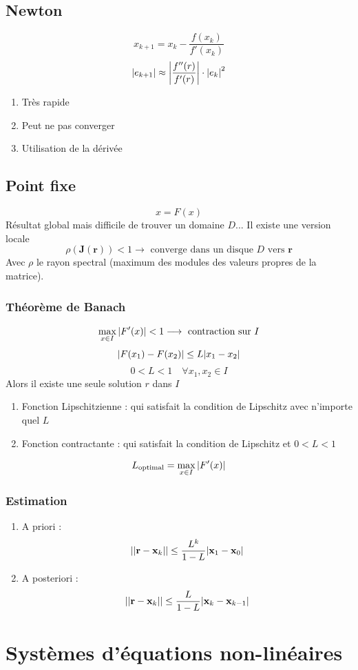 \documentclass[resume]{subfiles}
\begin{document}
\subsection{Newton}
$$\boxed{x_{k+1}=x_{k}-\frac{f(x_{k})}{f'(x_{k})}}$$
$$\abs{e_{k+1}}\approx \abs{\frac{f''(r)}{f'(r)}}\cdot \abs{e_k}^2$$
\begin{enumerate}
\item Très rapide
\item Peut ne pas converger
\item Utilisation de la dérivée
\end{enumerate}
\subsection{Point fixe}
$$\boxed{x=F(x)}$$
Résultat global mais difficile de trouver un domaine $D$... Il existe une version locale
$$\rho(\mathbf{J}(\mathbf{r}))<1\longrightarrow\text{ converge dans un disque } D\text{ vers }\mathbf{r}$$
Avec $\rho$ le rayon spectral (maximum des modules des valeurs propres de la matrice).
\subsubsection{Théorème de Banach}
$$\max_{x\in I}\abs{F'(x)}<1\longrightarrow\text{ contraction sur }I$$
$$\abs{F(x_1)-F(x_2)}\leq L\abs{x_1-x_2}$$
$$0<L<1\quad \forall x_1,x_2\in I$$
Alors il existe une seule solution $r$ dans $I$
\begin{enumerate}
\item Fonction Lipschitzienne : qui satisfait la condition de Lipschitz avec n'importe quel $L$
\item Fonction contractante : qui satisfait la condition de Lipschitz et $0<L<1$
\end{enumerate}
$$L_\text{optimal}=\max_{x\in I}\abs{F'(x)}$$
\subsubsection{Estimation}
\begin{enumerate}
\item A priori : 
$$\abs{\abs{\mathbf{r}-\mathbf{x}_k}}\leq \frac{L^{k}}{1-L}\abs{\mathbf{x}_1-\mathbf{x}_0}$$
\item A posteriori :
$$\abs{\abs{\mathbf{r}-\mathbf{x}_k}}\leq \frac{L}{1-L}\abs{\mathbf{x}_k-\mathbf{x}_{k-1}}$$
\end{enumerate}

\section{Systèmes d'équations non-linéaires}
\end{document}

